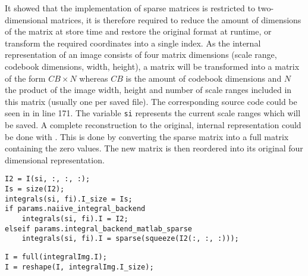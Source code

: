 It showed that the \MATLAB implementation of sparse matrices is restricted to two-dimensional matrices, it is therefore required to reduce the amount of dimensions of the matrix at store time and restore the original format at runtime, or transform the required coordinates into a single index. As the internal representation of an image consists of four matrix dimensions (scale range, codebook dimensions, width, height), a matrix will be transformed into a matrix of the form $CB \times N$ whereas $CB$ is the amount of codebook dimensions and $N$ the product of the image width, height and number of scale ranges included in this matrix (usually one per saved \MATLAB file). The corresponding source code could be seen in  in line 171. The variable \verb|si| represents the current scale ranges which will be saved. A complete reconstruction to the original, internal representation could be done with . This is done by converting the sparse matrix into a full matrix containing the zero values. The new matrix is then reordered into its original four dimensional representation.

\begin{lstlisting}[firstnumber=165,caption={Sparse storage method (get\_codebook\_integrals.m)},label=lst:storage_method_sparse]
I2 = I(si, :, :, :);
Is = size(I2);
integrals(si, fi).I_size = Is;
if params.naiive_integral_backend
    integrals(si, fi).I = I2;
elseif params.integral_backend_matlab_sparse
    integrals(si, fi).I = sparse(squeeze(I2(:, :, :)));
\end{lstlisting}

\begin{lstlisting}[firstnumber=29,caption={Sparse reconstruction by \MATLAB (getCodebookIntegrals.m)},label=lst:reconstruct_sparse_matlab]
I = full(integralImg.I);
I = reshape(I, integralImg.I_size);
\end{lstlisting}


